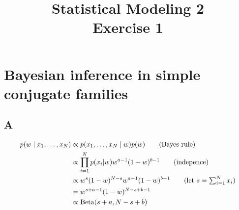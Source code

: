 \documentclass{article}
\title{Statistical Modeling 2 \\ Exercise 1}
\begin{document}
\maketitle

\section{Bayesian inference in simple conjugate families}
\subsection*{A}
\begin{align}
p(w \mid x_1, \ldots, x_N) &\propto p(x_1, \ldots, x_N \mid w) p(w) \tag{Bayes rule} \\
&\propto \prod_{i=1}^N p(x_i|w) w^{a-1}(1-w)^{b-1} \tag{indepence} \\
&\propto w^s (1-w)^{N-s}w^{a-1}(1-w)^{b-1} \tag{let \(s = \sum_{i=1}^N x_i\)} \\
&= w^{s+a-1}(1-w)^{N-s+b-1} \tag*{}\\
& \propto \mathrm{Beta}(s+a, N-s+b) \tag*{}
\end{align}
\end{document}
